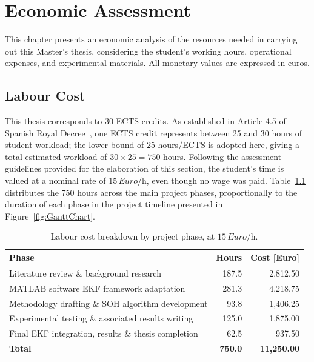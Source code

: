 \chapter{Economic Assessment}\label{sec:EconomicAssessment}

This chapter presents an economic analysis of the resources needed in carrying 
out this Master's thesis, considering the student's working hours, operational 
expenses, and experimental materials. All monetary values 
are expressed in euros.

\section{Labour Cost}

This thesis corresponds to 30 \ac{ECTS} credits. As established in Article 4.5 of 
Spanish Royal Decree~\cite{boe2003rd1125}, one \ac{ECTS} credit 
represents between 25 and 30 hours of student 
workload; the lower bound of 25 hours/\ac{ECTS} is adopted here, giving a total 
estimated workload of $30 \times 25 = 750$ hours. Following the assessment guidelines 
provided for the elaboration of this section, 
the student's time is valued at a nominal rate of $15\,Euro/\text{h}$, even though 
no wage was paid. Table~\ref{tab:LabourCost} distributes the 
750 hours across the main project phases, proportionally to the duration of each 
phase in the project timeline presented in Figure~\ref{fig:GanttChart}.

\begin{table}[H]
    \centering
    \begin{tabular}{lrr}
        \toprule
        \textbf{Phase} & \textbf{Hours} & \textbf{Cost [Euro]} \\
        \midrule
        Literature review \& background research                    & 187.5 & 2{,}812.50 \\
        MATLAB software \ac{EKF} framework adaptation               & 281.3 & 4{,}218.75 \\
        Methodology drafting \& \ac{SOH} algorithm development       &  93.8 & 1{,}406.25 \\
        Experimental testing \& associated results writing           & 125.0 & 1{,}875.00 \\
        Final \ac{EKF} integration, results \& thesis completion     &  62.5 &   937.50 \\
        \midrule
        \textbf{Total} & \textbf{750.0} & \textbf{11{,}250.00} \\
        \bottomrule
    \end{tabular}
    \caption{Labour cost breakdown by project phase, at $15\,Euro/\text{h}$.}
    \label{tab:LabourCost}
\end{table}

